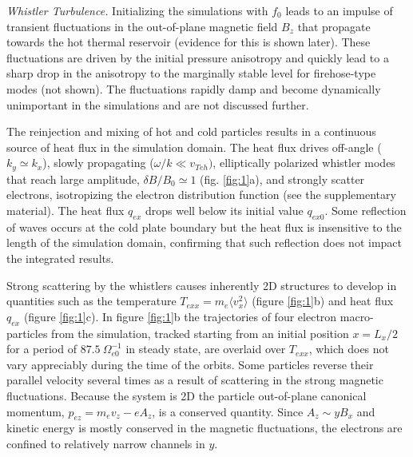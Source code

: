 \documentclass[%
 reprint,
superscriptaddress,
 amsmath,amssymb,
 aps,
]{revtex4-1}
\begin{document}
\textit{Whistler Turbulence.}  Initializing the
simulations with $f_0$ leads to an impulse of transient fluctuations
in the out-of-plane magnetic field $B_{z}$ that propagate towards the
hot thermal reservoir (evidence for this is shown later). These
fluctuations are driven by the initial pressure anisotropy and quickly
lead to a sharp drop in the anisotropy to the marginally stable level
for firehose-type modes (not shown). The fluctuations rapidly damp and
become dynamically unimportant in the simulations and are not
discussed further.

The reinjection and mixing of hot and cold particles results in a
continuous source of heat flux in the simulation domain. The heat flux drives
off-angle ($k_{y} \simeq k_{x}$), slowly propagating ($\omega/k \ll
v_{Teh})$, elliptically polarized whistler modes that reach large
amplitude, $\delta B/B_{0} \simeq 1$ (fig. \ref{fig:1}a), and strongly
scatter electrons, isotropizing the electron distribution function
(see the supplementary material). The heat flux $q_{ex}$ drops well
below its initial value $q_{ex0}$. Some reflection of waves occurs at
the cold plate boundary but the heat flux is insensitive to the length
of the simulation domain, confirming that such reflection does not
impact the integrated results.

Strong scattering by the whistlers causes inherently 2D
structures to develop in quantities such as the temperature $T_{exx} =
m_e\langle v_x^{2} \rangle$ (figure \ref{fig:1}b) and heat flux
$q_{ex}$ (figure \ref{fig:1}c). In figure \ref{fig:1}b the
trajectories of four electron macro-particles from the simulation,
tracked starting from an initial position $x=L_{x}/2$ for a period of
$87.5 \: \Omega_{e0}^{-1}$ in steady state, are overlaid over
$T_{exx}$, which does not vary appreciably during the time of the
orbits. Some particles reverse their parallel velocity several times
as a result of scattering in the strong magnetic fluctuations. Because
the system is 2D the particle out-of-plane
canonical momentum, $p_{ez}=m_{e}v_{z} -eA_{z}$, is a conserved
quantity. Since $A_{z} \sim yB_{x}$ and kinetic energy is mostly
conserved in the magnetic fluctuations, the electrons are confined to
relatively narrow channels in $y$.
\end{document}

